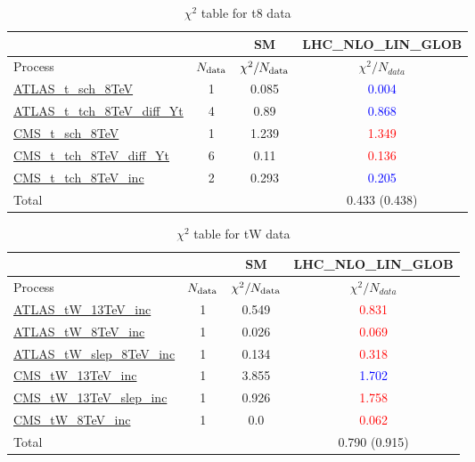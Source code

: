 \documentclass{article}
\begin{document}
\begin{table}[H]
\centering
\begin{tabular}{|l|c|c|c|}
\hline
 \multicolumn{2}{|c|}{} & SM& LHC_NLO_LIN_GLOB\\ \hline
Process & $N_{\rm data}$ & $\chi^ 2/N_{\rm data}$& $\chi^ 2/N_{data}$\\ \hline
\href{https://arxiv.org}{ATLAS_t_sch_8TeV} & 1 & 0.085 & \textcolor{blue}                            {0.004} \\ \hline
\href{https://arxiv.org}{ATLAS_t_tch_8TeV_diff_Yt} & 4 & 0.89 & \textcolor{blue}                            {0.868} \\ \hline
\href{https://arxiv.org}{CMS_t_sch_8TeV} & 1 & 1.239 & \textcolor{red}                            {1.349} \\ \hline
\href{https://arxiv.org}{CMS_t_tch_8TeV_diff_Yt} & 6 & 0.11 & \textcolor{red}                            {0.136} \\ \hline
\href{https://arxiv.org}{CMS_t_tch_8TeV_inc} & 2 & 0.293 & \textcolor{blue}                            {0.205} \\ \hline
\hline Total & &  & 0.433 (0.438) \\ \hline
\end{tabular}
\caption{$\chi^2$ table for t8 data}
\end{table}
\begin{table}[H]
\centering
\begin{tabular}{|l|c|c|c|}
\hline
 \multicolumn{2}{|c|}{} & SM& LHC_NLO_LIN_GLOB\\ \hline
Process & $N_{\rm data}$ & $\chi^ 2/N_{\rm data}$& $\chi^ 2/N_{data}$\\ \hline
\href{https://arxiv.org}{ATLAS_tW_13TeV_inc} & 1 & 0.549 & \textcolor{red}                            {0.831} \\ \hline
\href{https://arxiv.org}{ATLAS_tW_8TeV_inc} & 1 & 0.026 & \textcolor{red}                            {0.069} \\ \hline
\href{https://arxiv.org}{ATLAS_tW_slep_8TeV_inc} & 1 & 0.134 & \textcolor{red}                            {0.318} \\ \hline
\href{https://arxiv.org}{CMS_tW_13TeV_inc} & 1 & 3.855 & \textcolor{blue}                            {1.702} \\ \hline
\href{https://arxiv.org}{CMS_tW_13TeV_slep_inc} & 1 & 0.926 & \textcolor{red}                            {1.758} \\ \hline
\href{https://arxiv.org}{CMS_tW_8TeV_inc} & 1 & 0.0 & \textcolor{red}                            {0.062} \\ \hline
\hline Total & &  & 0.790 (0.915) \\ \hline
\end{tabular}
\caption{$\chi^2$ table for tW data}
\end{table}
\end{document}
